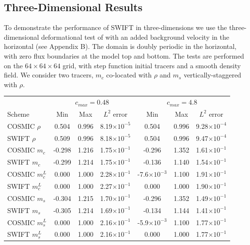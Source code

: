 \documentclass{ametsocV6.1}
\begin{document}
\subsection{Three-Dimensional Results} \label{sec:results3d}
To demonstrate the performance of SWIFT in three-dimensions we use the three-dimensional deformational test of \cite{skamarock2006limiters} with an added background velocity in the horizontal (see Appendix B). The domain is doubly periodic in the horizontal, with zero flux boundaries at the model top and bottom. The tests are performed on the $64\times64\times64$ grid, with step function initial tracers and a smooth density field. We consider two tracers, $m_c$ co-located with $\rho$ and $m_s$ vertically-staggered with $\rho$.\\
\begin{table} [h!]
\small
\begin{center}
\begin{tabular}{| l | c c c | c c c |} \hline
  & \multicolumn{3}{c|}{$c_{max}=0.48$} & \multicolumn{3}{c|}{$c_{max}=4.8$} \\
Scheme & Min & Max & $L^2$ error & Min & Max & $L^2$ error \\ \hline
COSMIC $\rho$ & 0.504 & 0.996 & 8.19$\times 10^{-5}$ & 0.504 &  0.996 & 9.28$\times 10^{-4}$ \\ 
SWIFT $\rho$ & 0.509 & 0.996 & 8.18$\times 10^{-5}$ & 0.504 & 0.996 & 9.47$\times 10^{-4}$ \\
COSMIC $m_c$ & -0.298 & 1.216 & 1.75$\times 10^{-1}$ & -0.296 & 1.352 & 1.61$\times 10^{-1}$ \\ 
SWIFT $m_c$ & -0.299 & 1.214 & 1.75$\times 10^{-1}$ & -0.136 & 1.140 & 1.54$\times 10^{-1}$ \\ 
COSMIC $m^L_c$ & 0.000 & 1.000 & 2.28$\times 10^{-1}$ & -7.6$\times 10^{-3}$ & 1.100 & 1.91$\times 10^{-1}$  \\ 
SWIFT $m^L_c$ & 0.000 & 1.000 & 2.27$\times 10^{-1}$ & 0.000 & 1.000 & 1.90$\times 10^{-1}$ \\  
COSMIC $m_s$ & -0.304 & 1.215 & 1.70$\times 10^{-1}$ & -0.296 & 1.352 & 1.49$\times 10^{-1}$ \\ 
SWIFT $m_s$ & -0.305 & 1.214 & 1.69$\times 10^{-1}$ & -0.134 & 1.144 & 1.41$\times 10^{-1}$ \\ 
COSMIC $m^L_s$ & 0.000 & 1.000 & 2.16$\times 10^{-1}$ & -5.9$\times 10^{-3}$ &  1.100 & 1.77$\times 10^{-1}$ \\ 
SWIFT $m^L_s$ &  0.000 & 1.000 & 2.16$\times 10^{-1}$ & 0.000 &  1.000 & 1.77$\times 10^{-1}$ \\ 

\end{tabular}
\end{center}
\end{table}
\end{document}
